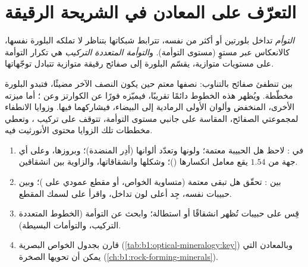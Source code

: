 \section{التعرّف على المعادن في الشريحة الرقيقة}

\begin{definition}\label{def:b1:optical-mineralogy:twin}
\emph{التوأم} تداخل بلورتين أو أكثر من  نفسه، تترابط شبكاتها بتناظر لا تملكه البلورة نفسها، كالانعكاس عبر مستوٍ (مستوى التوأمة). و\emph{التوأمة المتعددة التركيب} هي تكرار التوأمة على مستويات متوازية، يقسّم البلورة إلى صفائح رقيقة متوازية تتبادل توجّهاتها.
\end{definition}

بين  تنطفئ صفائح  بالتناوب: نصفها معتم حين يكون النصف الآخر مضيئًا، فتبدو البلورة مخطّطة. ويُظهر  هذه الخطوط دائمًا تقريبًا، فيميّزه فورًا عن الكوارتز وعن ؛ أما ميزته الأخرى،  المنخفض وألوان  الأولى الرمادية إلى البيضاء، فيشاركهما فيها. وزوايا الانطفاء لمجموعتي الصفائح، المقاسة على جانبي مستوى التوأمة، تتوقف على تركيب ، وتعطي مخططات تلك الزوايا محتوى الأنورثيت فيه.

\begin{method}\label{met:b1:optical-mineralogy:identify}
\begin{enumerate}
  \item في : لاحظ هل الحبيبة معتمة؛ ولونها وتعدّد ألوانها (أدِر المنضدة)؛ وبروزها، وعلى أي جهة من $1.54$ يقع معامل انكسارها ()؛ وشكلها وانشقاقاتها، والزاوية بين انشقاقين.
  \item بين : تحقّق هل تبقى معتمة (متساوية الخواص، أو مقطع عمودي على )؛ وبين حبيبات  نفسه، جِد أعلى لون تداخل، واقرأ  على  لسمك المقطع.
  \item قِس  على حبيبات تُظهر انشقاقًا أو استطالة؛ وابحث عن التوأمة (الخطوط المتعددة التركيب، والتوأمات البسيطة).
  \item قارن بجدول الخواص البصرية (\cref{tab:b1:optical-mineralogy:key}) وبالمعادن التي يمكن أن تحويها الصخرة (\cref{ch:b1:rock-forming-minerals}).
\end{enumerate}
\end{method}

